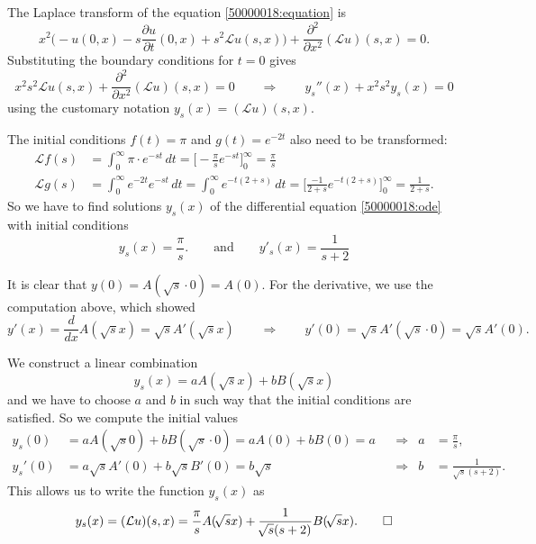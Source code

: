 \begin{loesung}
\begin{teilaufgaben}
\item
The Laplace transform of the equation \eqref{50000018:equation} is
\[
x^2\biggl(
-u(0,x) -s\frac{\partial u}{\partial t}(0,x) +s^2\mathcal{L}u(s,x)
\biggr)
+
\frac{\partial^2}{\partial x^2} (\mathcal{L}u)(s,x)
=
0.
\]
Substituting the boundary conditions for $t=0$ gives
\begin{equation}
x^2s^2\mathcal{L}u(s,x)
+
\frac{\partial^2}{\partial x^2} (\mathcal{L}u)(s,x)
=
0
\qquad\Rightarrow\qquad
y_s''(x) + x^2s^2y_s(x)=0
\label{50000018:ode}
\end{equation}
using the customary notation $y_s(x)=(\mathcal{L}u)(s,x)$.

The initial conditions
$f(t)=\pi$
and
$g(t)=e^{-2t}$
also need to be transformed:
\begin{align*}
\mathcal{L}f(s)
&=
\int_0^\infty \pi\cdot e^{-st}\,dt
=
\biggl[ -\frac{\pi}{s}e^{-st}\biggr]_0^\infty
=
\frac{\pi}{s}
\\
\mathcal{L}g(s)
&=
\int_0^\infty e^{-2t} e^{-st}\,dt
=
\int_0^\infty e^{-t(2+s)} \,dt
=
\biggl[
\frac{-1}{2+s}e^{-t(2+s)}
\biggr]_0^\infty
=
\frac1{2+s}.
\end{align*}
So we have to find solutions $y_s(x)$ of the differential equation
\eqref{50000018:ode} with initial conditions
\[
y_s(x) = \frac{\pi}{s}.
\qquad
\text{and}
\qquad
y'_s(x) = \frac1{s+2}
\]
\item
It is clear that $y(0)=A(\!\sqrt{s}\cdot 0)=A(0)$.
For the derivative, we use the computation above, which showed
\[
y'(x) = \frac{d}{dx} A(\!\sqrt{s}x) = \sqrt{s}A'(\!\sqrt{s}x)
\qquad\Rightarrow\qquad
y'(0)=\sqrt{s}A'(\!\sqrt{s}\cdot 0)=\sqrt{s}A'(0).
\]
\item
We construct a linear combination 
\[
y_s(x) = aA(\!\sqrt{s}x) + b B(\!\sqrt{s}x)
\]
and we have to choose $a$ and $b$ in such way that the initial conditions
are satisfied.
So we compute the initial values
\begin{align*}
y_s(0) &= aA(\!\sqrt{s}0) + bB(\!\sqrt{s}\cdot 0) = aA(0) + bB(0) = a
&&\Rightarrow& a &= \frac{\pi}s,
\\
y_s'(0)&= a\sqrt{s} A'(0) + b\sqrt{s} B'(0) = b\sqrt{s}
&&\Rightarrow& b &= \frac{1}{\!\sqrt{s}(s+2)}.
\end{align*}
This allows us to write the function $y_s(x)$ as
\[
y_s(x) = (\mathcal{L}u)(s,x)
=
\frac{\pi}{s}
A(\!\sqrt{s}x)
+
\frac{1}{\!\sqrt{s}(s+2)}B(\!\sqrt{s}x).
\qedhere
\]
\end{teilaufgaben}
\end{loesung}

